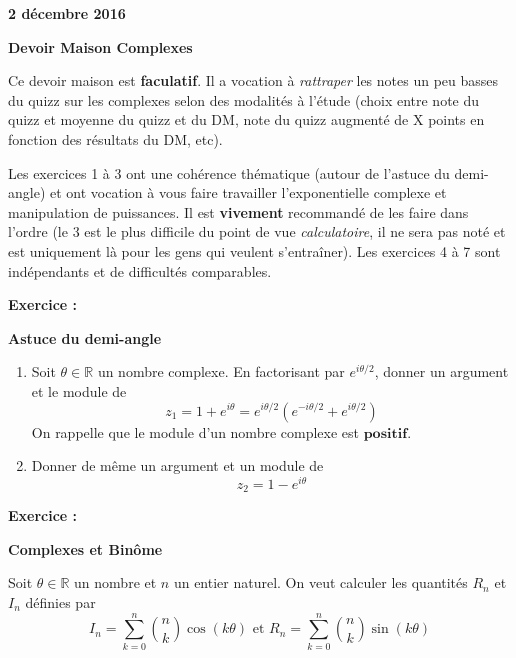 \documentclass[a4paper,12pt]{article}\usepackage[]{graphicx}\usepackage[]{color}
\def\Exam{Devoir Maison \og Complexes \fg{}}
\def\Date{2 décembre 2016}
\begin{document}
\setcounter{nexo}{1}
\newcommand{\Exo}{\medskip
  {\bf Exercice \arabic{nexo} : }
  \addtocounter{nexo}{1}}
\newcommand{\Pb}{{\bf Problème \arabic{nexo} : } 
\addtocounter{nexo}{1} \bigskip}
{\bf  \hfill \Date \quad ~}
%
\vskip 1cm
%
\centerline{\bf \LARGE \Exam}
%
\vskip 1.5cm
%



Ce devoir maison est \textbf{faculatif}. Il a vocation à \emph{rattraper} les notes un peu basses du quizz sur les complexes selon des modalités à l'étude (choix entre note du quizz et moyenne du quizz et du DM, note du quizz augmenté de X points en fonction des résultats du DM, etc). 

Les exercices 1 à 3 ont une cohérence thématique (autour de l'astuce du demi-angle) et ont vocation à vous faire travailler l'exponentielle complexe et manipulation de puissances. Il est \textbf{vivement} recommandé de les faire dans l'ordre (le 3 est le plus difficile du point de vue \emph{calculatoire}, il ne sera pas noté et est uniquement là pour les gens qui veulent s'entraîner). Les exercices 4 à 7 sont indépendants et de difficultés comparables. 

\Exo \textbf{Astuce du demi-angle}

\begin{enumerate}
\item Soit $\theta \in \mathbb{R}$ un nombre complexe. En factorisant par $e^{i\theta/2}$, donner un argument et le module de 
$$z_1 = 1 + e^{i\theta} = e^{i\theta/2} (e^{-i\theta/2} + e^{i\theta/2})$$
On rappelle que le module d'un nombre complexe est $\textbf{positif}$.
\item Donner de même un argument et un module de 
$$z_2 = 1 - e^{i\theta}$$
\end{enumerate}

\Exo \textbf{Complexes et Binôme}

Soit $\theta \in \mathbb{R}$ un nombre et $n$ un entier naturel. On veut calculer les quantités $R_n$ et $I_n$ définies par 
\begin{equation*}
I_n  = \sum_{k=0}^n {n \choose k} \cos(k\theta) \text{ et } R_n  = \sum_{k=0}^n {n \choose k} \sin(k\theta)
\end{equation*}
\end{document}
